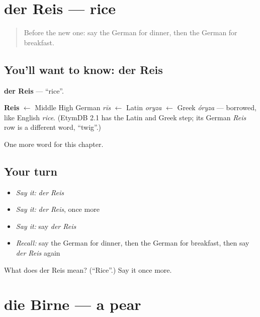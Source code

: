 \section[der Reis]{der Reis — rice}

\label{lesson:GE-C72-reis}



\begin{quote}
Before the new one: say the German for dinner, then the German for breakfast.
\end{quote}

\subsection*{You'll want to know: der Reis}
\textbf{der Reis} — \textquotedblleft{}rice\textquotedblright{}.

\begin{cousinweb}
\textbf{Reis} $\leftarrow$ Middle High German \emph{rīs} $\leftarrow$ Latin \emph{oryza} $\leftarrow$ Greek \emph{óryza} — borrowed, like English \emph{rice}. (EtymDB 2.1 has the Latin and Greek step; its German \emph{Reis} row is a different word, \textquotedblleft{}twig\textquotedblright{}.)
\end{cousinweb}

\begin{grammarlens}[title={What you've built}]
One more word for this chapter.
\end{grammarlens}

\subsection*{Your turn}
\begin{itemize}
\raggedright
  \item \emph{Say it:} \emph{der Reis}
  \item \emph{Say it:} \emph{der Reis}, once more
  \item \emph{Say it:} say \emph{der Reis}
  \item \emph{Recall:} say the German for dinner, then the German for breakfast, then say \emph{der Reis} again
\end{itemize}

\begin{tcolorbox}[breakable,colback=teal!4,colframe=teal!35!black,title={Before you move on}]
What does der Reis mean? (\textquotedblleft{}Rice\textquotedblright{}.) Say it once more.
\end{tcolorbox}
\section[die Birne]{die Birne — a pear}


